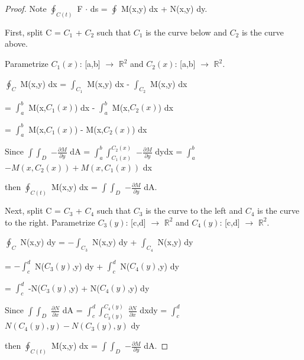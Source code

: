     \begin{proof}
        Note $\oint_{C(t)}$ F $\cdot$ ds = $\oint$ M(x,y) dx + N(x,y) dy.

        First, split C = $C_1$ + $C_2$ such that $C_1$ is the curve below
        and $C_2$ is the curve above.

        Parametrize $C_1(x)$: [a,b] $\rightarrow$ $\mathbb{R}^2$
        and $C_2(x)$: [a,b] $\rightarrow$ $\mathbb{R}^2$.

        \hspace{0.5cm}
        $\oint_{C}$ M(x,y) dx
        = $\int_{C_1}$ M(x,y) dx - $\int_{C_2}$ M(x,y) dx
        
        \hspace{3.1cm}
        = $\int_a^b$ M(x,$C_1(x)$) dx - $\int_a^b$ M(x,$C_2(x)$) dx

        \hspace{3.1cm}
        = $\int_a^b$ M(x,$C_1(x)$) - M(x,$C_2(x)$) dx

        Since
        $\int \int_D$ $-\frac{\partial M}{\partial y}$ dA
        = $\int_a^b \int_{C_1(x)}^{C_2(x)}$ $-\frac{\partial M}{\partial y}$ dydx
        = $\int_a^b$ $-M(x,C_2(x)) + M(x,C_1(x))$ dx

        then $\oint_{C(t)}$ M(x,y) dx
        = $\int \int_D$ $-\frac{\partial M}{\partial y}$ dA.

        \vspace{0.3cm}

        Next, split C = $C_3$ + $C_4$ such that $C_3$ is the curve to the left
        and $C_4$ is the curve to the right.
        Parametrize $C_3(y)$: [c,d] $\rightarrow$ $\mathbb{R}^2$
        and $C_4(y)$: [c,d] $\rightarrow$ $\mathbb{R}^2$.

        \hspace{0.5cm}
        $\oint_{C}$ N(x,y) dy
        = $-\int_{C_3}$ N(x,y) dy + $\int_{C_4}$ N(x,y) dy
        
        \hspace{3cm}
        = $-\int_c^d$ N($C_3(y)$,y) dy + $\int_c^d$ N($C_4(y)$,y) dy

        \hspace{3cm}
        = $\int_c^d$ -N($C_3(y)$,y) + N($C_4(y)$,y) dy

        Since
        $\int \int_D$ $\frac{\partial N}{\partial x}$ dA
        = $\int_c^d \int_{C_3(y)}^{C_4(y)}$ $\frac{\partial N}{\partial x}$ dxdy
        = $\int_c^d$ $N(C_4(y),y) - N(C_3(y),y)$ dy

        then $\oint_{C(t)}$ M(x,y) dx
        = $\int \int_D$ $-\frac{\partial M}{\partial y}$ dA.


\end{proof}

